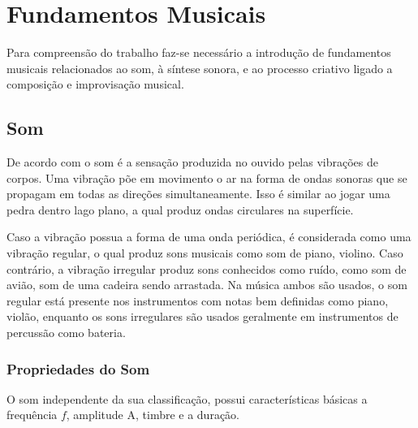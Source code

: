 \chapter{Fundamentos Musicais}
	\label{ch:fundamentos}
Para compreensão do trabalho faz-se necessário a introdução de fundamentos musicais relacionados ao som, à síntese sonora, e ao processo criativo ligado a composição e improvisação musical.

\section{Som}
De acordo com \cite{med1996teoria} o som é a sensação produzida no ouvido pelas vibrações de corpos. Uma vibração põe em movimento o ar na forma de ondas sonoras que se propagam em todas as direções simultaneamente. Isso é similar ao jogar uma pedra dentro lago plano, a qual produz ondas circulares na superfície. 

Caso a vibração possua a forma de uma onda periódica, é considerada como uma vibração regular, o qual produz sons musicais como som de piano, violino. Caso contrário, a vibração irregular produz sons conhecidos como ruído, como som de avião, som de uma cadeira sendo arrastada. Na música ambos são usados, o som regular está presente nos instrumentos com notas bem definidas como piano, violão, enquanto os sons irregulares são usados geralmente em instrumentos de percussão como bateria.  

\subsection{Propriedades do Som}
O som independente da sua classificação, possui características básicas a frequência $f$, amplitude A, timbre e a duração.     

